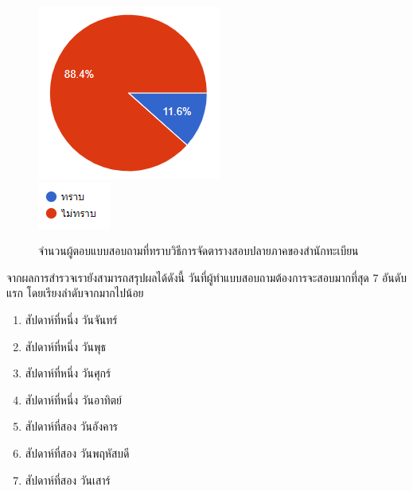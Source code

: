 \begin{figure}
  \begin{center}
    \includegraphics{images/registration_exam.png}\\[2ex]
    \includegraphics{images/legend_for_registration_exam.png}
  \end{center}
  \caption[Poem]{จำนวนผู้ตอบแบบสอบถามที่ทราบวิธีการจัดตารางสอบปลายภาคของสำนักทะเบียน}
  \label{fig:registration_exam}     
\end{figure}
จากผลการสำรวจเรายังสามารถสรุปผลได้ดังนี้
วันที่ผู้ทำแบบสอบถามต้องการจะสอบมากที่สุด 7 อันดับแรก โดยเรียงลำดับจากมากไปน้อย
\begin{enumerate}
  \item สัปดาห์ที่หนึ่ง วันจันทร์
  \item สัปดาห์ที่หนึ่ง วันพุธ
  \item สัปดาห์ที่หนึ่ง วันศุกร์ 
  \item สัปดาห์ที่หนึ่ง วันอาทิตย์
  \item สัปดาห์ที่สอง วันอังคาร
  \item สัปดาห์ที่สอง วันพฤหัสบดี
  \item สัปดาห์ที่สอง วันเสาร์
\end{enumerate}

